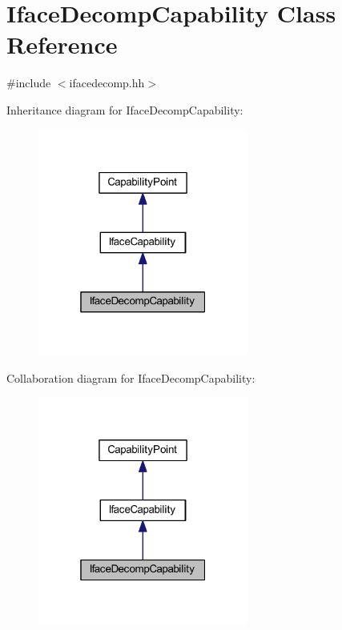 \hypertarget{class_iface_decomp_capability}{}\section{Iface\+Decomp\+Capability Class Reference}
\label{class_iface_decomp_capability}


{\ttfamily \#include $<$ifacedecomp.\+hh$>$}



Inheritance diagram for Iface\+Decomp\+Capability\+:
\nopagebreak
\begin{figure}[H]
\begin{center}
\leavevmode
\includegraphics[width=196pt]{class_iface_decomp_capability__inherit__graph}
\end{center}
\end{figure}


Collaboration diagram for Iface\+Decomp\+Capability\+:
\nopagebreak
\begin{figure}[H]
\begin{center}
\leavevmode
\includegraphics[width=196pt]{class_iface_decomp_capability__coll__graph}
\end{center}
\end{figure}
